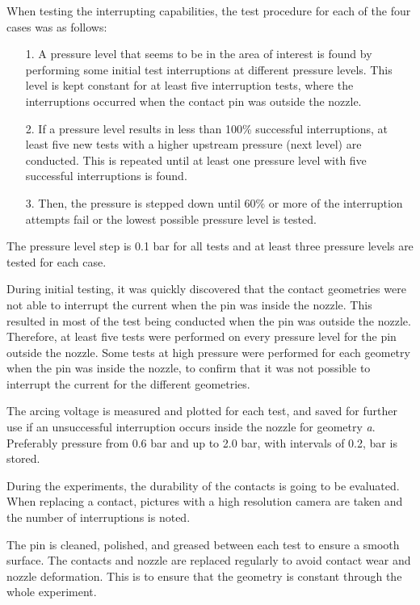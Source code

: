 \documentclass[10pt,a4paper,twoside]{article}
\begin{document}
When testing the interrupting capabilities, the test procedure for each of the four cases was as follows: 

\begin{itemize}
\item[1.] A pressure level that seems to be in the area of interest is found by performing some initial test interruptions at different pressure levels. This level is kept constant for at least five interruption tests, where the interruptions occurred when the contact pin was outside the nozzle.
\item[2.] If a pressure level results in less than 100\% successful interruptions, at least five new tests with a higher upstream pressure (next level) are conducted. This is repeated until at least one pressure level with five successful interruptions is found.
\item[3.] Then, the pressure is stepped down until 60\% or more of the interruption attempts fail or the lowest possible pressure level is tested.
\end{itemize}

The pressure level step is 0.1 bar for all tests and at least three pressure levels are tested for each case.\newline

During initial testing, it was quickly discovered that the contact geometries were not able to interrupt the current when the pin was inside the nozzle. This resulted in most of the test being conducted when the pin was outside the nozzle. Therefore, at least five tests were performed on every pressure level for the pin outside the nozzle. Some tests at high pressure were performed for each geometry when the pin was inside the nozzle, to confirm that it was not possible to interrupt the current for the different geometries.

The arcing voltage is measured and plotted for each test, and saved for further use if an unsuccessful interruption occurs inside the nozzle for geometry \textit{a}. Preferably pressure from 0.6 bar and up to 2.0 bar, with intervals of 0.2, bar is stored.

During the experiments, the durability of the contacts is going to be evaluated. When replacing a contact, pictures with a high resolution camera are taken and the number of interruptions is noted. 

The pin is cleaned, polished, and greased between each test to ensure a smooth surface. The contacts and nozzle are replaced regularly to avoid contact wear and nozzle deformation. This is to ensure that the geometry is constant through the whole experiment.
\end{document}
